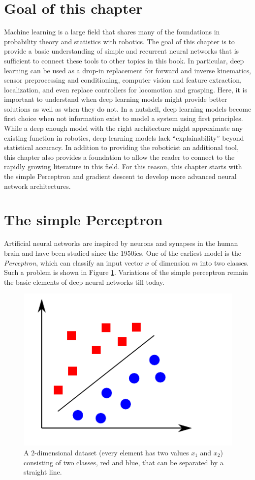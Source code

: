 \documentclass[paper=6.14in:9.21in,pagesize=pdftex,11pt,twoside,openright]{scrbook}
\begin{document}
\section{Goal of this chapter}
Machine learning is a large field that shares many of the foundations in probability theory and statistics with robotics. The goal of this chapter is to provide a basic understanding of simple and recurrent neural networks that is sufficient to connect these tools to other topics in this book. In particular, deep learning can be used as a drop-in replacement for forward and inverse kinematics, sensor preprocessing and conditioning, computer vision and feature extraction, localization, and even replace controllers for locomotion and grasping. Here, it is important to understand when deep learning models might provide better solutions as well as when they do not. In a nutshell, deep learning models become first choice when not information exist to model a system using first principles. While a deep enough model with the right architecture might approximate any existing function in robotics, deep learning models lack ``explainability'' beyond statistical accuracy. In addition to providing the roboticist an additional tool, this chapter also provides a foundation to allow the reader to connect to the rapidly growing literature in this field. For this reason, this chapter starts with the simple Perceptron and gradient descent to develop more advanced neural network architectures. 

\section{The simple Perceptron}
Artificial neural networks are inspired by neurons and synapses in the human brain and have been studied since the 1950ies. One of the earliest model is the \emph{Perceptron}, which can classify an input vector $x$ of dimension $m$ into two classes. Such a problem is shown in Figure \ref{fig:linearsep}. Variations of the simple perceptron remain the basic elements of deep neural networks till today.

\begin{figure}[!htb]
\centering
\includegraphics[width=0.5\columnwidth]{figs/linearlyseparable}
\caption{A 2-dimensional dataset (every element has two values $x_1$ and $x_2$) consisting of two classes, red and blue, that can be separated by a straight line.\label{fig:linearsep}}
\end{figure}
\end{document}
